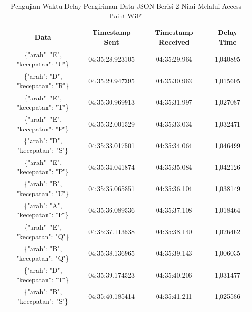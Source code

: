 \begin{longtable}{|ccc|c|}
  \caption{Pengujian Waktu Delay Pengiriman Data JSON Berisi 2 Nilai Melalui Access Point WiFi}
  \label{tbl:delayWiFiJSON}\\
  \hline
  \multicolumn{1}{|c|}{Data}                              & \multicolumn{1}{c|}{Timestamp Sent}  & Timestamp Received & Delay Time  \\ \hline
  \endfirsthead
  \endhead
  \multicolumn{1}{|c|}{\{"arah": "E", "kecepatan": "U"\}} & \multicolumn{1}{c|}{04:35:28.923105} & 04:35:29.964       & 1,040895    \\ \hline
  \multicolumn{1}{|c|}{\{"arah": "D", "kecepatan": "R"\}} & \multicolumn{1}{c|}{04:35:29.947395} & 04:35:30.963       & 1,015605    \\ \hline
  \multicolumn{1}{|c|}{\{"arah": "E", "kecepatan": "T"\}} & \multicolumn{1}{c|}{04:35:30.969913} & 04:35:31.997       & 1,027087    \\ \hline
  \multicolumn{1}{|c|}{\{"arah": "E", "kecepatan": "P"\}} & \multicolumn{1}{c|}{04:35:32.001529} & 04:35:33.034       & 1,032471    \\ \hline
  \multicolumn{1}{|c|}{\{"arah": "D", "kecepatan": "S"\}} & \multicolumn{1}{c|}{04:35:33.017501} & 04:35:34.064       & 1,046499    \\ \hline
  \multicolumn{1}{|c|}{\{"arah": "E", "kecepatan": "P"\}} & \multicolumn{1}{c|}{04:35:34.041874} & 04:35:35.084       & 1,042126    \\ \hline
  \multicolumn{1}{|c|}{\{"arah": "B", "kecepatan": "U"\}} & \multicolumn{1}{c|}{04:35:35.065851} & 04:35:36.104       & 1,038149    \\ \hline
  \multicolumn{1}{|c|}{\{"arah": "A", "kecepatan": "P"\}} & \multicolumn{1}{c|}{04:35:36.089536} & 04:35:37.108       & 1,018464    \\ \hline
  \multicolumn{1}{|c|}{\{"arah": "E", "kecepatan": "Q"\}} & \multicolumn{1}{c|}{04:35:37.113538} & 04:35:38.140       & 1,026462    \\ \hline
  \multicolumn{1}{|c|}{\{"arah": "B", "kecepatan": "Q"\}} & \multicolumn{1}{c|}{04:35:38.136965} & 04:35:39.143       & 1,006035    \\ \hline
  \multicolumn{1}{|c|}{\{"arah": "D", "kecepatan": "T"\}} & \multicolumn{1}{c|}{04:35:39.174523} & 04:35:40.206       & 1,031477    \\ \hline
  \multicolumn{1}{|c|}{\{"arah": "B", "kecepatan": "S"\}} & \multicolumn{1}{c|}{04:35:40.185414} & 04:35:41.211       & 1,025586    \\ \hline

\end{longtable}
